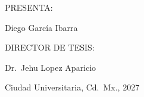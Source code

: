 \begin{titlepage}
  \vfill   %
 
  {\large PRESENTA:\par}
  \vspace{0.2cm}
  {\Large Diego García Ibarra \par}
 
  \vfill   %
 
  {\large DIRECTOR DE TESIS:\par}
  \vspace{0.2cm}
  {\large Dr.\ Jehu Lopez Aparicio\par}
 
  \vfill   %
 
  {\large Ciudad Universitaria, Cd.\ Mx., 2027\par}
 
\end{titlepage}
 
